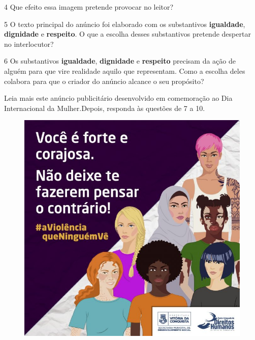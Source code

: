 \num{4} Que efeito essa imagem pretende provocar no leitor?


\num{5} O texto principal do anúncio foi elaborado com os substantivos
\textbf{igualdade}, \textbf{dignidade} e \textbf{respeito}. O que a
escolha desses substantivos pretende despertar no interlocutor?


\num{6} Os substantivos \textbf{igualdade}, \textbf{dignidade} e
\textbf{respeito} precisam da ação de alguém para que vire realidade
aquilo que representam. Como a escolha deles colabora para que o criador
do anúncio alcance o seu propósito?


Leia mais este anúncio publicitário desenvolvido em comemoração ao Dia
Internacional da Mulher.Depois, responda às questões de 7 a 10.


\begin{figure}[htpb!]
\centering
\includegraphics[width=.8\textwidth]{./_SAEB_9_POR/media/image21.jpeg}
\end{figure}

